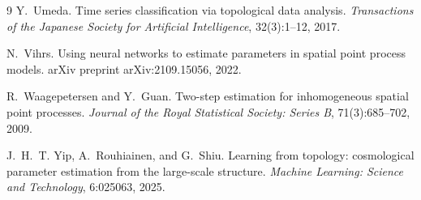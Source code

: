 \documentclass[11pt,a4paper]{article}
\theoremstyle{definitioncolon}
\begin{document}
{\begin{thebibliography}{9}
Y.~Umeda.
\newblock Time series classification via topological data analysis.
\newblock \emph{Transactions of the Japanese Society for Artificial
Intelligence}, 32(3):1--12, 2017.

N.~Vihrs.
\newblock Using neural networks to estimate parameters in spatial point process
models.
\newblock arXiv preprint arXiv:2109.15056, 2022.

R.~Waagepetersen and Y.~Guan.
\newblock Two-step estimation for inhomogeneous spatial point processes.
\newblock \emph{Journal of the Royal Statistical Society: Series B},
71(3):685--702, 2009.

J.~H.~T. Yip, A.~Rouhiainen, and G.~Shiu.
\newblock Learning from topology: cosmological parameter estimation from the
large-scale structure.
\newblock \emph{Machine Learning: Science and Technology}, 6:025063, 2025.
\end{thebibliography}
}
\end{document}

